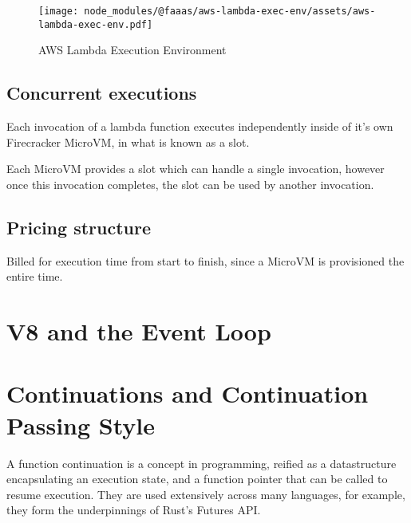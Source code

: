 \begin{figure*}[t]
    \texttt{[image: node\_modules/@faaas/aws-lambda-exec-env/assets/aws-lambda-exec-env.pdf]}
    \caption{AWS Lambda Execution Environment}
    \label{fig:aws-lambda-exec-env}
\end{figure*}

\subsection{Concurrent executions}

Each invocation of a lambda function executes independently inside of it's own Firecracker MicroVM, in what is known as a slot.

Each MicroVM provides a slot which can handle a single invocation, however once this invocation completes, the slot can be used by another invocation.

\subsection{Pricing structure}

Billed for execution time from start to finish, since a MicroVM is provisioned the entire time.

\section{V8 and the Event Loop}
\label{sec:js-event-loop}


\section{Continuations and Continuation Passing Style}
A function continuation is a concept in programming\cite{sussmanSCHEMEInterpreterExtended1975}, reified as a datastructure encapsulating an execution state, and a function pointer that can be called to resume execution. They are used extensively across many languages, for example, they form the underpinnings of Rust's Futures API.
